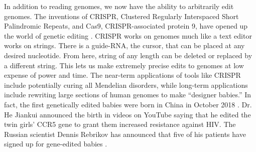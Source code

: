 In addition to reading genomes, we now have the ability to arbitrarily edit genomes.
The inventions of CRISPR, Clustered Regularly Interspaced Short Palindromic Repeats, and Cas9, CRISPR-associated protein 9, have opened up the world of genetic editing \cite{Zhang2014}.
CRISPR works on genomes much like a text editor works on strings.
There is a guide-RNA, the cursor, that can be placed at any desired nucleotide.
From here, string of any length can be deleted or replaced by a different string.
This lets us make extremely precise edits to genomes at low expense of power and time.
The near-term applications of tools like CRISPR include potentially curing all Mendelian disorders, while long-term applications include rewriting large sections of human genomes to make ``designer babies.''
In fact, the first genetically edited babies were born in China in October 2018 \cite{crisprbabies2018}.
Dr. He Jiankui announced the birth in videos on YouTube saying that he edited the twin girls' CCR5 gene to grant them increased resistance against HIV.
The Russian scientist Dennis Rebrikov has announced that five of his patients have signed up for gene-edited babies \cite{Cohen2019}.
